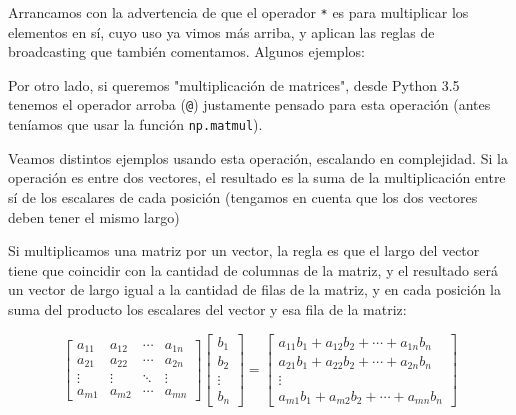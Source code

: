 Arrancamos con la advertencia de que el operador \verb|*| es para multiplicar los elementos en sí, cuyo uso ya vimos más arriba, y aplican las reglas de broadcasting que también comentamos. Algunos ejemplos:


Por otro lado, si queremos "multiplicación de matrices", desde Python 3.5 tenemos el operador arroba (\verb|@|) justamente pensado para esta operación (antes teníamos que usar la función \texttt{np.matmul}).

Veamos distintos ejemplos usando esta operación, escalando en complejidad.  Si la operación es entre dos vectores, el resultado es la suma de la multiplicación entre sí de los escalares de cada posición (tengamos en cuenta que los dos vectores deben tener el mismo largo)


Si multiplicamos una matriz por un vector, la regla es que el largo del vector tiene que coincidir con la cantidad de columnas de la matriz, y el resultado será un vector de largo igual a la cantidad de filas de la matriz, y en cada posición la suma del producto los escalares del vector y esa fila de la matriz:

\begin{equation*}
    \begin{bmatrix}
        a_{11} & a_{12} & \cdots & a_{1n}  \\
        a_{21} & a_{22} & \cdots & a_{2n}  \\
        \vdots & \vdots & \ddots & \vdots  \\
        a_{m1} & a_{m2} & \cdots & a_{mn}
    \end{bmatrix}
    \begin{bmatrix}
        b_1 \\
        b_2 \\
        \vdots \\
        b_n
    \end{bmatrix}
    =
    \begin{bmatrix}
        a_{11} b_1 + a_{12} b_2 + \cdots + a_{1n} b_n  \\
        a_{21} b_1 + a_{22} b_2 + \cdots + a_{2n} b_n  \\
        \vdots \\
        a_{m1} b_1 + a_{m2} b_2 + \cdots + a_{mn} b_n
    \end{bmatrix}
\end{equation*}

